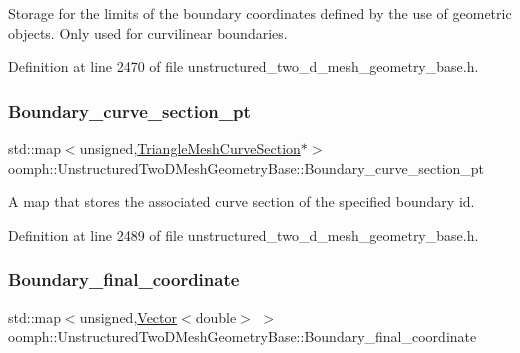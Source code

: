 Storage for the limits of the boundary coordinates defined by the use of geometric objects. Only used for curvilinear boundaries. 

Definition at line 2470 of file unstructured\+\_\+two\+\_\+d\+\_\+mesh\+\_\+geometry\+\_\+base.\+h.

\mbox{\label{classoomph_1_1UnstructuredTwoDMeshGeometryBase_abde107f80f0a70d1dd35bd21f96d20d3}} 
\subsubsection{\texorpdfstring{Boundary\+\_\+curve\+\_\+section\+\_\+pt}{Boundary\_curve\_section\_pt}}
{\footnotesize\ttfamily std\+::map$<$unsigned,\hyperlink{classoomph_1_1TriangleMeshCurveSection}{Triangle\+Mesh\+Curve\+Section}$\ast$$>$ oomph\+::\+Unstructured\+Two\+D\+Mesh\+Geometry\+Base\+::\+Boundary\+\_\+curve\+\_\+section\+\_\+pt\hspace{0.3cm}{\ttfamily [protected]}}



A map that stores the associated curve section of the specified boundary id. 



Definition at line 2489 of file unstructured\+\_\+two\+\_\+d\+\_\+mesh\+\_\+geometry\+\_\+base.\+h.

\mbox{\label{classoomph_1_1UnstructuredTwoDMeshGeometryBase_a1753fbd79a4a982ab4ab0f5b276404f2}} 
\subsubsection{\texorpdfstring{Boundary\+\_\+final\+\_\+coordinate}{Boundary\_final\_coordinate}}
{\footnotesize\ttfamily std\+::map$<$unsigned,\hyperlink{classoomph_1_1Vector}{Vector}$<$double$>$ $>$ oomph\+::\+Unstructured\+Two\+D\+Mesh\+Geometry\+Base\+::\+Boundary\+\_\+final\+\_\+coordinate\hspace{0.3cm}{\ttfamily [protected]}}



